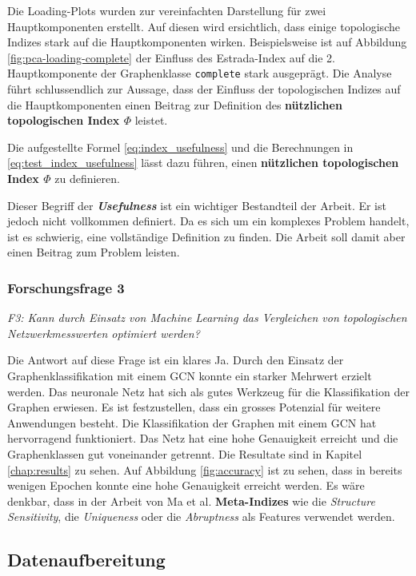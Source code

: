 Die Loading-Plots wurden zur vereinfachten Darstellung für zwei Hauptkomponenten erstellt. Auf diesen wird ersichtlich, dass einige topologische Indizes stark auf die Hauptkomponenten wirken. Beispielsweise ist auf Abbildung \ref{fig:pca-loading-complete} der Einfluss des Estrada-Index auf die 2. Hauptkomponente der Graphenklasse \texttt{complete} stark ausgeprägt.
Die Analyse führt schlussendlich zur Aussage, dass der Einfluss der topologischen Indizes auf die Hauptkomponenten einen Beitrag zur Definition des \textbf{nützlichen topologischen Index $\Phi$} leistet.

Die aufgestellte Formel \ref{eq:index_usefulness} und die Berechnungen in \ref{eq:test_index_usefulness} lässt dazu führen, einen \textbf{nützlichen topologischen Index $\Phi$} zu definieren.

Dieser Begriff der \textbf{\textit{Usefulness}} ist ein wichtiger Bestandteil der Arbeit. Er ist jedoch nicht vollkommen definiert. Da es sich um ein komplexes Problem handelt, ist es schwierig, eine vollständige Definition zu finden. Die Arbeit soll damit aber einen Beitrag zum Problem leisten.

\subsubsection{Forschungsfrage 3}

\textit{F3: Kann durch Einsatz von Machine Learning das Vergleichen von topologischen Netzwerkmesswerten optimiert werden?}

Die Antwort auf diese Frage ist ein klares Ja. Durch den Einsatz der Graphenklassifikation mit einem GCN konnte ein starker Mehrwert erzielt werden.
Das neuronale Netz hat sich als gutes Werkzeug für die Klassifikation der Graphen erwiesen.
Es ist festzustellen, dass ein grosses Potenzial für weitere Anwendungen besteht. Die Klassifikation der Graphen mit einem GCN hat hervorragend funktioniert.
Das Netz hat eine hohe Genauigkeit erreicht und die Graphenklassen gut voneinander getrennt. Die Resultate sind in Kapitel \ref{chap:results} zu sehen.
Auf Abbildung \ref{fig:accuracy} ist zu sehen, dass in bereits wenigen Epochen konnte eine hohe Genauigkeit erreicht werden.
Es wäre denkbar, dass in der Arbeit von Ma et al. \textbf{Meta-Indizes} wie die \textit{Structure Sensitivity}, die \textit{Uniqueness} oder die \textit{Abruptness} als Features verwendet werden.

\subsection{Datenaufbereitung}

